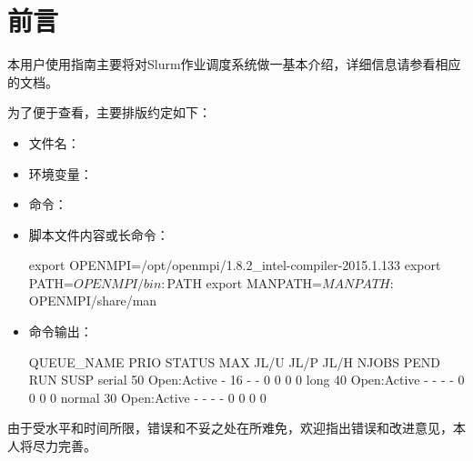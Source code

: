 \section{前言}

本用户使用指南主要将对Slurm作业调度系统做一基本介绍，详细信息请参看相应的文档。

为了便于查看，主要排版约定如下：
\begin{itemize}
	\item 文件名：
	\item 环境变量：
	\item 命令：
	\item 脚本文件内容或长命令：
\begin{SH}
export OPENMPI=/opt/openmpi/1.8.2_intel-compiler-2015.1.133
export PATH=$OPENMPI/bin:$PATH
export MANPATH=$MANPATH:$OPENMPI/share/man
\end{SH}
\item 命令输出：
\small
\begin{OUT}
QUEUE_NAME      PRIO STATUS          MAX JL/U JL/P JL/H NJOBS  PEND   RUN  SUSP 
serial           50  Open:Active       -   16    -    -     0     0     0     0
long             40  Open:Active       -    -    -    -     0     0     0     0
normal           30  Open:Active       -    -    -    -     0     0     0     0
\end{OUT}
\end{itemize}

由于受水平和时间所限，错误和不妥之处在所难免，欢迎指出错误和改进意见，本人将尽力完善。%


